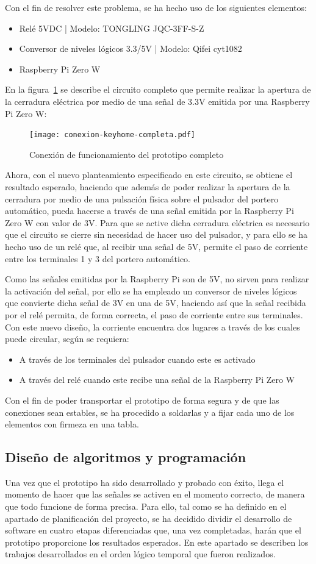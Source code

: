 Con el fin de resolver este problema, se ha hecho uso de los siguientes elementos:
\begin{itemize}
\item{Relé 5VDC | Modelo: TONGLING JQC-3FF-S-Z}
\item{Conversor de niveles lógicos 3.3/5V | Modelo: Qifei cyt1082}
\item{Raspberry Pi Zero W}
\end{itemize}
En la figura~\ref{fig:conexion-keyhome-completa} se describe el circuito completo que permite realizar la apertura de la cerradura eléctrica por medio de una señal de 3.3V emitida por una Raspberry Pi Zero W:
\begin{figure}[tbp]
\centering
\texttt{[image: conexion-keyhome-completa.pdf]}
\caption{Conexión de funcionamiento del prototipo completo}
\label{fig:conexion-keyhome-completa}
\end{figure}
Ahora, con el nuevo planteamiento especificado en este circuito, se obtiene el resultado esperado, haciendo que además de poder realizar la apertura de la cerradura por medio de una pulsación física sobre el pulsador del portero automático, pueda hacerse a través de una señal emitida por la Raspberry Pi Zero W con valor de 3V.
Para que se active dicha cerradura eléctrica es necesario que el circuito se cierre sin necesidad de hacer uso del pulsador, y para ello se ha hecho uso de un relé que, al recibir una señal de 5V, permite el paso de corriente entre los terminales 1 y 3 del portero automático.

Como las señales emitidas por la Raspberry Pi son de 5V, no sirven para realizar la activación del señal, por ello se ha empleado un conversor de niveles lógicos que convierte dicha señal de 3V en una de 5V, haciendo así que la señal recibida por el relé permita, de forma correcta, el paso de corriente entre sus terminales.
Con este nuevo diseño, la corriente encuentra dos lugares a través de los cuales puede circular, según se requiera:
\begin{itemize}
\item{A través de los terminales del pulsador cuando este es activado}
\item{A través del relé cuando este recibe una señal de la Raspberry Pi Zero W}
\end{itemize}
Con el fin de poder transportar el prototipo de forma segura y de que las conexiones sean estables, se ha procedido a soldarlas y a fijar cada uno de los elementos con firmeza en una tabla.

\subsection{Diseño de algoritmos y programación}
Una vez que el prototipo ha sido desarrollado y probado con éxito, llega el momento de hacer que las señales se activen en el momento correcto, de manera que todo funcione de forma precisa. Para ello, tal como se ha definido en el apartado de planificación del proyecto, se ha decidido dividir el desarrollo de software en cuatro etapas diferenciadas que, una vez completadas, harán que el prototipo proporcione los resultados esperados. En este apartado se describen los trabajos desarrollados en el orden lógico temporal que fueron realizados.

